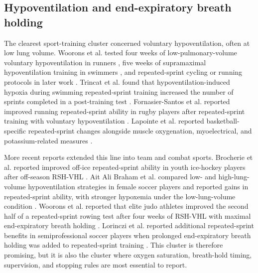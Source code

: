 \documentclass[12pt,a4paper]{article}
\begin{document}
\subsection{Hypoventilation and end-expiratory breath holding}
The clearest sport-training cluster concerned voluntary hypoventilation, often at low lung volume. Woorons et al. tested four weeks of low-pulmonary-volume voluntary hypoventilation in runners \parencite{woorons_effects_2008}, five weeks of supramaximal hypoventilation training in swimmers \parencite{woorons_hypoventilation_2016}, and repeated-sprint cycling or running protocols in later work \parencite{woorons_acute_2017,woorons_cerebral_2019,woorons_physiological_2019,woorons_transferable_2020}. Trincat et al. found that hypoventilation-induced hypoxia during swimming repeated-sprint training increased the number of sprints completed in a post-training test \parencite{trincat_repeated-sprint_2017}. Fornasier-Santos et al. reported improved running repeated-sprint ability in rugby players after repeated-sprint training with voluntary hypoventilation \parencite{fornasier-santos_repeated-sprint_2018}. Lapointe et al. reported basketball-specific repeated-sprint changes alongside muscle oxygenation, myoelectrical, and potassium-related measures \parencite{lapointe_impact_2020}.

More recent reports extended this line into team and combat sports. Brocherie et al. reported improved off-ice repeated-sprint ability in youth ice-hockey players after off-season RSH-VHL \parencite{brocherie_effects_2023}. Ait Ali Braham et al. compared low- and high-lung-volume hypoventilation strategies in female soccer players and reported gains in repeated-sprint ability, with stronger hypoxemia under the low-lung-volume condition \parencite{ait_ali_braham_m_and_ouchen_y_and_woorons_x_effects_2024}. Woorons et al. reported that elite judo athletes improved the second half of a repeated-sprint rowing test after four weeks of RSH-VHL with maximal end-expiratory breath holding \parencite{woorons_x_and_faucher_c_and_dufour_sp_and_brocherie_f_and_robach_p_and_connes_p_and_brugniaux_jv_and_verges_s_and_gaston_af_and_millet_g_and_dupuy_o_and_pichon_a_hypoventilation_2024}. Lorinczi et al. reported additional repeated-sprint benefits in semiprofessional soccer players when prolonged end-expiratory breath holding was added to repeated-sprint training \parencite{lorinczi_additional_2025}. This cluster is therefore promising, but it is also the cluster where oxygen saturation, breath-hold timing, supervision, and stopping rules are most essential to report.
\end{document}
